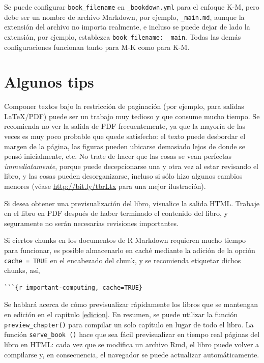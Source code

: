 \documentclass[12pt,]{krantz}
\theoremstyle{definition}
\theoremstyle{definition}
\theoremstyle{remark}
\begin{document}
Se puede configurar \texttt{book\_filename} en \texttt{\_bookdown.yml}
para el enfoque K-M, pero debe ser un nombre de archivo Markdown, por
ejemplo, \texttt{\_main.md}, aunque la extensión del archivo no importa
realmente, e incluso se puede dejar de lado la extensión, por ejemplo,
establezca \texttt{book\_filename:\ \_main}. Todas las demás
configuraciones funcionan tanto para M-K como para K-M.

\section{Algunos tips}\label{algunos-tips}

Componer textos bajo la restricción de paginación (por ejemplo, para
salidas LaTeX/PDF) puede ser un trabajo muy tedioso y que consume mucho
tiempo. Se recomienda no ver la salida de PDF frecuentemente, ya que la
mayoría de las veces es muy poco probable que quede satisfecho: el texto
puede desbordar el margen de la página, las figuras pueden ubicarse
demasiado lejos de donde se pensó inicialmente, etc. No trate de hacer
que las cosas se vean perfectas \emph{immediatamente}, porque puede
decepcionarse una y otra vez al estar revisando el libro, y las cosas
pueden desorganizarse, incluso si sólo hizo algunos cambios menores
(véase \url{http://bit.ly/tbrLtx} para una mejor ilustración).

Si desea obtener una previsualización del libro, visualice la salida
HTML. Trabaje en el libro en PDF después de haber terminado el contenido
del libro, y seguramente no serán necesarias revisiones importantes.

Si ciertos chunks en los documentos de R Markdown requieren mucho tiempo
para funcionar, es posible almacenarlo en caché mediante la adición de
la opción \texttt{cache\ =\ TRUE} en el encabezado del chunk, y se
recomienda etiquetar dichos chunks, así,

\begin{verbatim}
```{r important-computing, cache=TRUE}
\end{verbatim}

Se hablará acerca de cómo previsualizar rápidamente los libros que se
mantengan en edición en el capítulo \ref{edicion}. En resumen, se puede
utilizar la función \texttt{preview\_chapter()} para compilar un solo
capítulo en lugar de todo el libro. La función \texttt{serve\_book\ ()}
hace que sea fácil previsualizar en tiempo real páginas del libro en
HTML: cada vez que se modifica un archivo Rmd, el libro puede volver a
compilarse y, en consecuencia, el navegador se puede actualizar
automáticamente.
\end{document}

